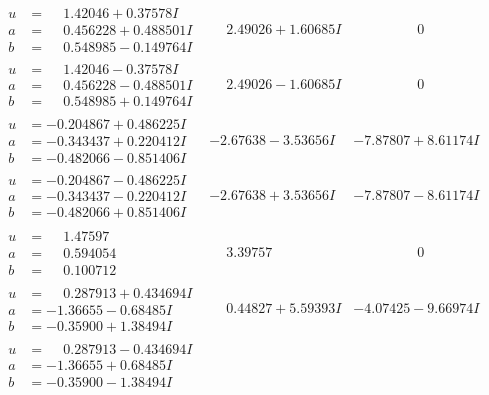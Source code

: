 \documentclass[1p]{elsarticle_modified}
\theoremstyle{definition}
\begin{document}
$$\begin{array}{c|c|c}
\begin{aligned}
u &= \phantom{-}1.42046 + 0.37578 I \\
a &= \phantom{-}0.456228 + 0.488501 I \\
b &= \phantom{-}0.548985 - 0.149764 I\end{aligned}
 & \phantom{-}2.49026 + 1.60685 I & \phantom{-0.000000 } 0 \\ \hline\begin{aligned}
u &= \phantom{-}1.42046 - 0.37578 I \\
a &= \phantom{-}0.456228 - 0.488501 I \\
b &= \phantom{-}0.548985 + 0.149764 I\end{aligned}
 & \phantom{-}2.49026 - 1.60685 I & \phantom{-0.000000 } 0 \\ \hline\begin{aligned}
u &= -0.204867 + 0.486225 I \\
a &= -0.343437 + 0.220412 I \\
b &= -0.482066 - 0.851406 I\end{aligned}
 & -2.67638 - 3.53656 I & -7.87807 + 8.61174 I \\ \hline\begin{aligned}
u &= -0.204867 - 0.486225 I \\
a &= -0.343437 - 0.220412 I \\
b &= -0.482066 + 0.851406 I\end{aligned}
 & -2.67638 + 3.53656 I & -7.87807 - 8.61174 I \\ \hline\begin{aligned}
u &= \phantom{-}1.47597\phantom{ +0.000000I} \\
a &= \phantom{-}0.594054\phantom{ +0.000000I} \\
b &= \phantom{-}0.100712\phantom{ +0.000000I}\end{aligned}
 & \phantom{-}3.39757\phantom{ +0.000000I} & \phantom{-0.000000 } 0 \\ \hline\begin{aligned}
u &= \phantom{-}0.287913 + 0.434694 I \\
a &= -1.36655 - 0.68485 I \\
b &= -0.35900 + 1.38494 I\end{aligned}
 & \phantom{-}0.44827 + 5.59393 I & -4.07425 - 9.66974 I \\ \hline\begin{aligned}
u &= \phantom{-}0.287913 - 0.434694 I \\
a &= -1.36655 + 0.68485 I \\
b &= -0.35900 - 1.38494 I\end{aligned}

\end{array}$$
\end{document}
